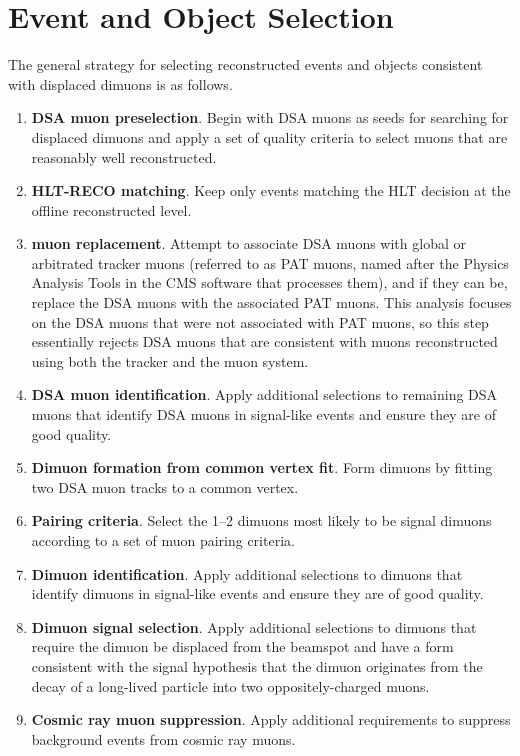 \section{Event and Object Selection}
The general strategy for selecting reconstructed events and objects consistent with displaced dimuons is as follows.
\begin{enumerate}
  \item \textbf{DSA muon preselection}. Begin with DSA muons as seeds for searching for displaced dimuons and apply a set of quality criteria to select muons that are reasonably well reconstructed.
  \item \textbf{HLT-RECO matching}. Keep only events matching the HLT decision at the offline reconstructed level.
  \item \textbf{\DSAToPAT muon replacement}. Attempt to associate DSA muons with global or arbitrated tracker muons (referred to as PAT muons, named after the Physics Analysis Tools in the CMS software that processes them), and if they can be, replace the DSA muons with the associated PAT muons. This analysis focuses on the DSA muons that were not associated with PAT muons, so this step essentially rejects DSA muons that are consistent with muons reconstructed using both the tracker and the muon system.
  \item \textbf{DSA muon identification}. Apply additional selections to remaining DSA muons that identify DSA muons in signal-like events and ensure they are of good quality.
  \item \textbf{Dimuon formation from common vertex fit}. Form dimuons by fitting two DSA muon tracks to a common vertex.
  \item \textbf{Pairing criteria}. Select the 1--2 dimuons most likely to be signal dimuons according to a set of muon pairing criteria.
  \item \textbf{Dimuon identification}. Apply additional selections to dimuons that identify dimuons in signal-like events and ensure they are of good quality.
  \item \textbf{Dimuon signal selection}. Apply additional selections to dimuons that require the dimuon be displaced from the beamspot and have a form consistent with the signal hypothesis that the dimuon originates from the decay of a long-lived particle into two oppositely-charged muons.
  \item \textbf{Cosmic ray muon suppression}. Apply additional requirements to suppress background events from cosmic ray muons.
\end{enumerate}

